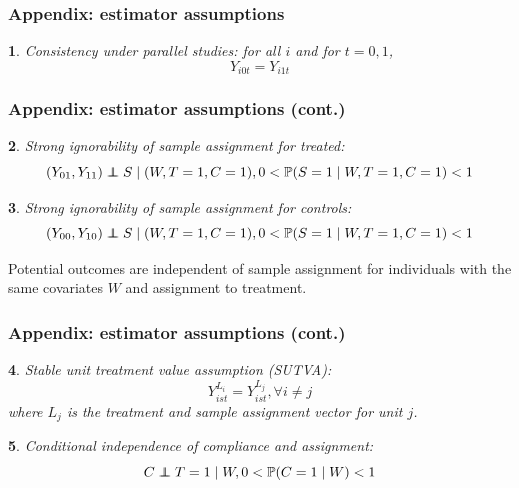 \documentclass{beamer}
\makeatletter
\newtheorem*{assumption*}{\assumptionnumber}
\providecommand{\assumptionnumber}{}
\newenvironment{assumption}[2]
 {%
  \renewcommand{\assumptionnumber}{Assumption #1}%
  \begin{assumption*}%
  \protected@edef\@currentlabel{#1}%
 }
 {%
  \end{assumption*}
 }
\newcommand{\pr}{\mathbb{P}} %
\newcommand\independent{\protect\mathpalette{\protect\independenT}{\perp}}
\def\independenT#1#2{\mathrel{\rlap{$#1#2$}\mkern2mu{#1#2}}}
\makeatother
\begin{document}
\begin{frame}
\begin{singlespace}
\begin{tiny}


\end{tiny}
\end{singlespace}
\itemize
\end{frame}

\begin{frame}
\frametitle{Appendix: estimator assumptions}
\begin{assumption}{1}{}\label{consistency}
Consistency under parallel studies: for all $i$ and for $t=0, 1$,
$$Y_{i0t} = Y_{i1t}$$
\end{assumption}
\end{frame}

\begin{frame}
\frametitle{Appendix: estimator assumptions (cont.)}
\begin{assumption}{2}{}\label{si_treat}
Strong ignorability of sample assignment for treated:
\begin{equation*}
(Y_{01}, Y_{11}) \independent S \mid (W, T=1,C = 1), 0 < \pr(S=1 \mid W, T=1,C = 1) <1 
\end{equation*}
\end{assumption}

\begin{assumption}{3}{}\label{si_ctrl}
Strong ignorability of sample assignment for controls:
\begin{equation*}
(Y_{00}, Y_{10}) \independent S \mid (W, T=1,C = 1), 0 < \pr(S=1 \mid W, T=1,C = 1) <1 
\end{equation*}\end{assumption}

\noindent Potential outcomes are independent of sample assignment for individuals with the same covariates $W$ and assignment to treatment.
\end{frame}

\begin{frame}
\frametitle{Appendix: estimator assumptions (cont.)}
\begin{assumption}{4}{}\label{sutva}
Stable unit treatment value assumption (SUTVA):
\begin{equation*}
Y_{ist}^{L_i} = Y_{ist}^{L_j},  \forall i \neq j
\end{equation*}
where $L_j$ is the treatment and sample assignment vector for unit $j$. \end{assumption}
 
\begin{assumption}{5}{}\label{compl}
Conditional independence of compliance and assignment:
\begin{equation*}
C \independent T=1 \mid W, 0 < \pr(C = 1 \mid W) < 1
\end{equation*}
\end{assumption}
\end{frame}
\end{document}
